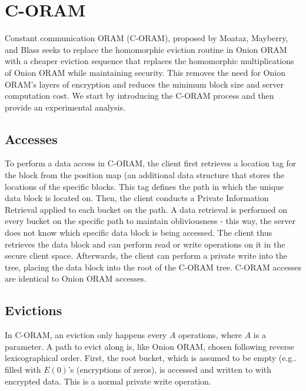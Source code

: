 \documentclass[12pt, oneside]{article}   	%
\begin{document}
\section{C-ORAM}
Constant communication ORAM (C-ORAM), proposed by Moataz, Mayberry, and Blass seeks to replace the homomorphic eviction routine in Onion ORAM with a cheaper eviction sequence that replaces the homomorphic multiplications of Onion ORAM while maintaining security. This removes the need for Onion ORAM's layers of encryption and reduces the minimum block size and server computation cost. We start by introducing the C-ORAM process and then provide an experimental analysis.

\subsection{Accesses}

To perform a data access in C-ORAM, the client first retrieves a location tag for the block from the position map (an additional data structure that stores the locations of the specific blocks. This tag defines the path in which the unique data block is located on. Then, the client conducts a Private Information Retrieval applied to each bucket on the path. A data retrieval is performed on every bucket on the specific path to maintain obliviousness - this way, the server does not know which specific data block is being accessed. The client thus retrieves the data block and can perform read or write operations on it in the secure client space. Afterwards, the client can perform a private write into the tree, placing the data block into the root of the C-ORAM tree. C-ORAM accesses are identical to Onion ORAM accesses.

\subsection{Evictions}
In C-ORAM, an eviction only happens every $A$  operations, where $A$ is a parameter. A path to evict along is, like Onion ORAM, chosen following reverse lexicographical order. First, the root bucket, which is assumed to be empty (e.g.. filled with $E (0)$'s (encryptions of zeros), is accessed and written to with encrypted data. This is a normal private write operation.
\end{document}
